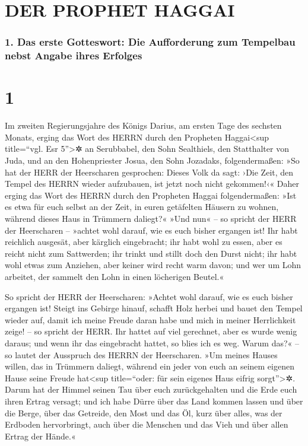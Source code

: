 \hypertarget{der-prophet-haggai}{%
\section{DER PROPHET HAGGAI}\label{der-prophet-haggai}}

\hypertarget{das-erste-gotteswort-die-aufforderung-zum-tempelbau-nebst-angabe-ihres-erfolges}{%
\subsubsection{1. Das erste Gotteswort: Die Aufforderung zum Tempelbau
nebst Angabe ihres
Erfolges}\label{das-erste-gotteswort-die-aufforderung-zum-tempelbau-nebst-angabe-ihres-erfolges}}

\hypertarget{section}{%
\section{1}\label{section}}

 Im zweiten Regierungsjahre des Königs Darius, am ersten
Tage des sechsten Monats, erging das Wort des HERRN durch den Propheten
Haggai\textless sup title=``vgl. Esr 5''\textgreater✲ an Serubbabel, den
Sohn Sealthiels, den Statthalter von Juda, und an den Hohenpriester
Josua, den Sohn Jozadaks, folgendermaßen:  »So hat der
HERR der Heerscharen gesprochen: Dieses Volk da sagt: ›Die Zeit, den
Tempel des HERRN wieder aufzubauen, ist jetzt noch nicht gekommen!‹«
 Daher erging das Wort des HERRN durch den Propheten
Haggai folgendermaßen:  »Ist es etwa für euch selbst an
der Zeit, in euren getäfelten Häusern zu wohnen, während dieses Haus in
Trümmern daliegt?«  »Und nun« -- so spricht der HERR der
Heerscharen -- »achtet wohl darauf, wie es euch bisher ergangen ist!
 Ihr habt reichlich ausgesät, aber kärglich eingebracht;
ihr habt wohl zu essen, aber es reicht nicht zum Sattwerden; ihr trinkt
und stillt doch den Durst nicht; ihr habt wohl etwas zum Anziehen, aber
keiner wird recht warm davon; und wer um Lohn arbeitet, der sammelt den
Lohn in einen löcherigen Beutel.«

 So spricht der HERR der Heerscharen: »Achtet wohl darauf,
wie es euch bisher ergangen ist!  Steigt ins Gebirge
hinauf, schafft Holz herbei und bauet den Tempel wieder auf, damit ich
meine Freude daran habe und mich in meiner Herrlichkeit zeige! -- so
spricht der HERR.  Ihr hattet auf viel gerechnet, aber es
wurde wenig daraus; und wenn ihr das eingebracht hattet, so blies ich es
weg. Warum das?« -- so lautet der Ausspruch des HERRN der Heerscharen.
»Um meines Hauses willen, das in Trümmern daliegt, während ein jeder von
euch an seinem eigenen Hause seine Freude hat\textless sup title=``oder:
für sein eigenes Haus eifrig sorgt''\textgreater✲.  Darum
hat der Himmel seinen Tau über euch zurückgehalten und die Erde euch
ihren Ertrag versagt;  und ich habe Dürre über das Land
kommen lassen und über die Berge, über das Getreide, den Most und das
Öl, kurz über alles, was der Erdboden hervorbringt, auch über die
Menschen und das Vieh und über allen Ertrag der Hände.«

